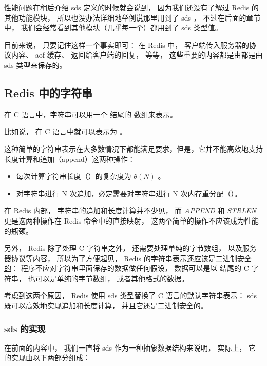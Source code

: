 \documentclass[a4paper,11pt,english]{sphinxmanual}
\begin{document}
性能问题在稍后介绍 sds 定义的时候就会说到，
因为我们还没有了解过 Redis 的其他功能模块，
所以也没办法详细地举例说那里用到了 sds ，
不过在后面的章节中，
我们会经常看到其他模块（几乎每一个）都用到了 sds 类型值。

目前来说，
只要记住这样一个事实即可：
在 Redis 中，
客户端传入服务器的协议内容、
aof 缓存、
返回给客户端的回复，
等等，
这些重要的内容都是由都是由 sds 类型来保存的。


\subsection{Redis 中的字符串}
\label{internal-datastruct/sds:redis}
在 C 语言中，字符串可以用一个  结尾的  数组来表示。

比如说，  在 C 语言中就可以表示为  。

这种简单的字符串表示在大多数情况下都能满足要求，但是，它并不能高效地支持长度计算和追加（append）这两种操作：
\begin{itemize}
\item {} 
每次计算字符串长度（）的复杂度为 $\theta(N)$ 。

\item {} 
对字符串进行 N 次追加，必定需要对字符串进行 N 次内存重分配（）。

\end{itemize}

在 Redis 内部，
字符串的追加和长度计算并不少见，
而 \href{http://redis.readthedocs.org/en/latest/string/append.html\#append}{\emph{APPEND}} 和 \href{http://redis.readthedocs.org/en/latest/string/strlen.html\#strlen}{\emph{STRLEN}} 更是这两种操作在 Redis 命令中的直接映射，
这两个简单的操作不应该成为性能的瓶颈。

另外，
Redis 除了处理 C 字符串之外，
还需要处理单纯的字节数组，
以及服务器协议等内容，
所以为了方便起见，
Redis 的字符串表示还应该是\href{http://en.wikipedia.org/wiki/Binary-safe}{二进制安全的}：
程序不应对字符串里面保存的数据做任何假设，
数据可以是以  结尾的 C 字符串，
也可以是单纯的字节数组，
或者其他格式的数据。

考虑到这两个原因，
Redis 使用 sds 类型替换了 C 语言的默认字符串表示：
sds 既可以高效地实现追加和长度计算，
并且它还是二进制安全的。


\subsubsection{sds 的实现}
\label{internal-datastruct/sds:id4}
在前面的内容中，
我们一直将 sds 作为一种抽象数据结构来说明，
实际上，
它的实现由以下两部分组成：
\end{document}
